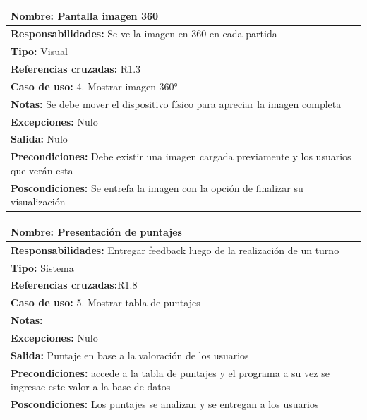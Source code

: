 \begin{table}[H]
    \begin{center}
        \begin{tabular}{| m{15cm} |}       
        	\hline 
        	\textbf{Nombre:} Pantalla imagen 360\\
        	\hline
        	\textbf{Responsabilidades:} Se ve la imagen en 360 en cada partida \\
        	\hline
        	\textbf{Tipo:} Visual\\
        	\hline
        	\textbf{Referencias cruzadas:} R1.3\\
        	\hline
        	\textbf{Caso de uso:} 4. Mostrar imagen 360°\\
        	\hline
        	\textbf{Notas:} Se debe mover el dispositivo físico para apreciar la imagen completa\\
        	\hline
        	\textbf{Excepciones:} Nulo \\
        	\hline
        	\textbf{Salida:} Nulo \\
        	\hline
        	\textbf{Precondiciones:} Debe existir una imagen cargada previamente y los usuarios que verán esta \\
        	\hline
        	\textbf{Poscondiciones:} Se entrefa la imagen con la opción de finalizar su visualización\\
        	\hline
        \end{tabular}
    \end{center}
\end{table}

\begin{table}[H]
    \begin{center}
        \begin{tabular}{| m{15cm} |}        
        	\hline 
        	\textbf{Nombre:} Presentación de puntajes \\
        	\hline
        	\textbf{Responsabilidades: }Entregar feedback luego de la realización de un turno \\
        	\hline
        	\textbf{Tipo:} Sistema \\
        	\hline
        	\textbf{Referencias cruzadas:}R1.8 \\
        	\hline
        	\textbf{Caso de uso:} 5. Mostrar tabla de puntajes\\
        	\hline
        	\textbf{Notas:} \\
        	\hline
        	\textbf{Excepciones:} Nulo \\
        	\hline
        	\textbf{Salida:} Puntaje en base a la valoración de los usuarios\\
        	\hline
        	\textbf{Precondiciones:}  accede a la tabla de puntajes y el programa a su vez se ingresae este valor a la base de datos \\
        	\hline
        	\textbf{Poscondiciones:} Los puntajes se analizan y se entregan a los usuarios\\
        	\hline
        \end{tabular}
    \end{center}
\end{table}

